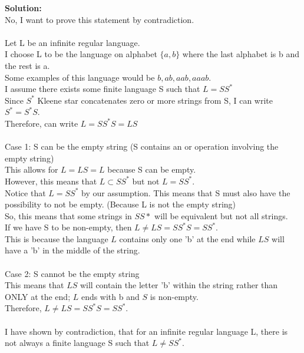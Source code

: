 \documentclass[boldsans]{article}
\newenvironment{solution}
{\bigskip \noindent \textbf{Solution: \\}}
{}
\begin{document}
\begin{enumerate}
\begin{solution}
    No, I want to prove this statement by contradiction.\\
    \\
    Let L be an infinite regular language.\\
    I choose L to be the language on alphabet $\{a, b\}$ where the last alphabet is b and the rest is a.\\
    Some examples of this language would be $b, ab, aab, aaab$.\\
    I assume there exists some finite language S such that $L = SS^*$\\
    Since $S^*$ Kleene star concatenates zero or more strings from S, I can write $S^* = S^*S$.\\
    Therefore, can write $L = SS^*S = LS$\\
    \\
    Case 1: S can be the empty string (S contains an or operation involving the empty string)\\
    This allows for $L = LS = L$ because S can be empty.\\
    However, this means that $L \subset SS^*$ but not $L=SS^*$.\\
    Notice that $L = SS^*$ by our assumption. This means that S must also have the possibility to not be empty. (Because L is not the empty string)\\
    So, this means that some strings in $SS*$ will be equivalent but not all strings.\\
    If we have S to be non-empty, then $L \not = LS = SS^*S = SS^*$.\\
    This is because the language $L$ contains only one 'b' at the end while $LS$ will have a 'b' in the middle of the string.\\
    \\
    Case 2: S cannot be the empty string\\
    This means that $LS$ will contain the letter 'b' within the string rather than ONLY at the end; $L$ ends with b and $S$ is non-empty.\\
    Therefore, $L \not = LS = SS^*S = SS^*$.\\
    \\
    I have shown by contradiction, that for an infinite regular language L, there is not always a finite language S such that $L \not = SS^*$.\\
    
    
\end{solution}

\end{enumerate}
\end{document}
